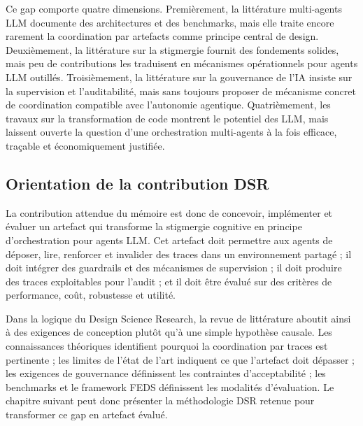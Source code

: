 Ce gap comporte quatre dimensions. Premièrement, la littérature multi-agents LLM documente des architectures et des benchmarks, mais elle traite encore rarement la coordination par artefacts comme principe central de design. Deuxièmement, la littérature sur la stigmergie fournit des fondements solides, mais peu de contributions les traduisent en mécanismes opérationnels pour agents LLM outillés. Troisièmement, la littérature sur la gouvernance de l'IA insiste sur la supervision et l'auditabilité, mais sans toujours proposer de mécanisme concret de coordination compatible avec l'autonomie agentique. Quatrièmement, les travaux sur la transformation de code montrent le potentiel des LLM, mais laissent ouverte la question d'une orchestration multi-agents à la fois efficace, traçable et économiquement justifiée.

\subsection{Orientation de la contribution DSR}\label{orientation-de-la-contribution-dsr}

La contribution attendue du mémoire est donc de concevoir, implémenter et évaluer un artefact qui transforme la stigmergie cognitive en principe d'orchestration pour agents LLM. Cet artefact doit permettre aux agents de déposer, lire, renforcer et invalider des traces dans un environnement partagé ; il doit intégrer des guardrails et des mécanismes de supervision ; il doit produire des traces exploitables pour l'audit ; et il doit être évalué sur des critères de performance, coût, robustesse et utilité.

Dans la logique du Design Science Research, la revue de littérature aboutit ainsi à des exigences de conception plutôt qu'à une simple hypothèse causale. Les connaissances théoriques identifient pourquoi la coordination par traces est pertinente ; les limites de l'état de l'art indiquent ce que l'artefact doit dépasser ; les exigences de gouvernance définissent les contraintes d'acceptabilité ; les benchmarks et le framework FEDS définissent les modalités d'évaluation. Le chapitre suivant peut donc présenter la méthodologie DSR retenue pour transformer ce gap en artefact évalué.

